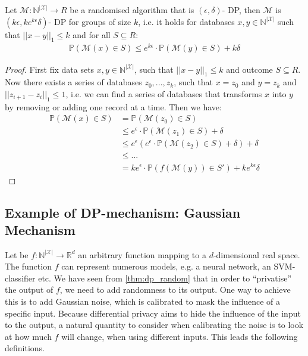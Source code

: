 \begin{thm}
    Let $\mathcal{M}: \mathbb{N}^{|\mathcal{X}|} \rightarrow R$ be a randomised algorithm that is $(\epsilon, \delta)$- DP, then $\mathcal{M}$ is $(k\epsilon, k e^{k\epsilon} \delta)$- DP for groups of size $k$, i.e. it holds for databases $x,y \in \mathbb{N}^{|\mathcal{X}|}$ such that $||x-y||_1\le k$ and for all $S \subseteq R$:
    \begin{align}
        \mathbb{P}(\mathcal{M}(x) \in S) \le e^{k\epsilon} \cdot \mathbb{P}(\mathcal{M}(y) \in S) + k\delta 
    \end{align}
\end{thm}
\begin{proof}
    First fix data sets $x,y \in \mathbb{N}^{|\mathcal{X}|}$, such that $||x-y||_1\le k$ and outcome $S \subseteq R$. Now there exists a series of databases $z_0,..., z_k$, such that $x=z_0$ and $y=z_k$ and $|| z_{i+1} - z_i||_1 \le 1$, i.e. we can find a series of databases that transforms $x$ into $y$ by removing or adding one record at a time. Then we have:
    \begin{align}
        \mathbb{P}(\mathcal{M}(x)\in S) &= \mathbb{P}(\mathcal{M}(z_0)\in S) \nonumber \\
        &\le e^\epsilon \cdot \mathbb{P}(\mathcal{M}(z_1)\in S) + \delta \nonumber \\
        &\le e^\epsilon \left( e^\epsilon \cdot \mathbb{P}(\mathcal{M}(z_2)\in S) + \delta \right) + \delta \nonumber \\
        &\le ... \nonumber \\
        &= k e^\epsilon \cdot \mathbb{P}(f(\mathcal{M}(y))\in S') + k e^{k \epsilon} \delta
    \end{align}
\end{proof}



\subsection{Example of DP-mechanism: Gaussian Mechanism}

Let be $f:\mathbb{N}^{|\mathcal{X}|} \longrightarrow \mathbb{R}^d$ an arbitrary function mapping to a $d$-dimensional real space. The function $f$ can represent numerous models, e.g. a neural network, an SVM-classifier etc. We have seen from \cref{thm:dp_random} that in order to ``privatise'' the output of $f$, we need to add randomness to its output. One way to achieve this is to add Gaussian noise, which is calibrated to mask the influence of a specific input. Because differential privacy aims to hide the influence of the input to the output, a natural quantity to consider when calibrating the noise is to look at how much $f$ will change, when using different inputs. This leads the following definitions.

